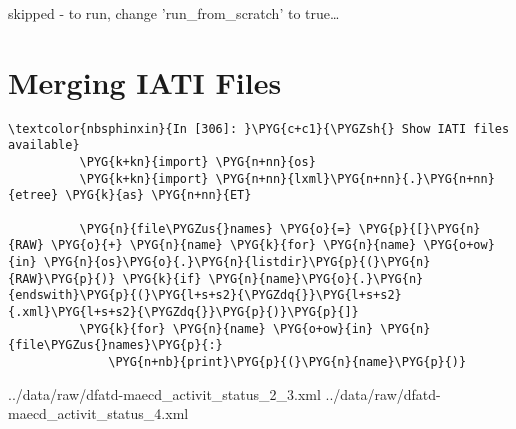 \documentclass[letterpaper,10pt,english]{sphinxmanual}
\begin{document}
%
\begin{OriginalVerbatim}[commandchars=\\\{\}]
skipped - to run, change 'run\_from\_scratch' to true{\ldots}
\end{OriginalVerbatim}
\relax

\section{Merging IATI Files}
\label{\detokenize{Global Affairs Canada - Compliance Report:Merging-IATI-Files}}
\begin{Verbatim}[commandchars=\\\{\}]
\textcolor{nbsphinxin}{In [306]: }\PYG{c+c1}{\PYGZsh{} Show IATI files available}
          \PYG{k+kn}{import} \PYG{n+nn}{os}
          \PYG{k+kn}{import} \PYG{n+nn}{lxml}\PYG{n+nn}{.}\PYG{n+nn}{etree} \PYG{k}{as} \PYG{n+nn}{ET}
          
          \PYG{n}{file\PYGZus{}names} \PYG{o}{=} \PYG{p}{[}\PYG{n}{RAW} \PYG{o}{+} \PYG{n}{name} \PYG{k}{for} \PYG{n}{name} \PYG{o+ow}{in} \PYG{n}{os}\PYG{o}{.}\PYG{n}{listdir}\PYG{p}{(}\PYG{n}{RAW}\PYG{p}{)} \PYG{k}{if} \PYG{n}{name}\PYG{o}{.}\PYG{n}{endswith}\PYG{p}{(}\PYG{l+s+s2}{\PYGZdq{}}\PYG{l+s+s2}{.xml}\PYG{l+s+s2}{\PYGZdq{}}\PYG{p}{)}\PYG{p}{]}
          \PYG{k}{for} \PYG{n}{name} \PYG{o+ow}{in} \PYG{n}{file\PYGZus{}names}\PYG{p}{:}
              \PYG{n+nb}{print}\PYG{p}{(}\PYG{n}{name}\PYG{p}{)}
\end{Verbatim}
%
\begin{OriginalVerbatim}[commandchars=\\\{\}]
../data/raw/dfatd-maecd\_activit\_status\_2\_3.xml
../data/raw/dfatd-maecd\_activit\_status\_4.xml
\end{OriginalVerbatim}
\relax
\end{document}
